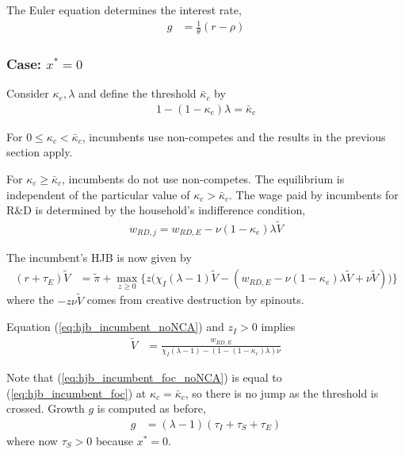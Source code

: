 \documentclass[12pt,english]{article}
\theoremstyle{remark}
\begin{document}
The Euler equation determines the interest rate, 
\begin{align}
	g &= \frac{1}{\theta} (r - \rho) \label{eq:euler}
\end{align}

\subsubsection{Case: $x^* = 0$}

Consider $\kappa_{e}, \lambda$ and define the threshold $\bar{\kappa}_c$ by 
\begin{align}
	1-(1-\kappa_{e})\lambda= \bar{\kappa}_c \label{eq_nca_threshold}
\end{align}

For $0 \le \kappa_{c} < \bar{\kappa}_c$, incumbents use non-competes and the results in the previous section apply.

For $\kappa_{c} \ge \bar{\kappa}_c$, incumbents do not use non-competes. The equilibrium is independent of the particular value of $\kappa_{c} > \bar{\kappa}_c$. The wage paid by incumbents for R\&D is determined by the household's indifference condition,
\begin{align}
	w_{RD,j} = w_{RD,E}- \nu (1-\kappa_{e}) \lambda \tilde{V} \label{eq:wage_rd}
\end{align}

The incumbent's HJB is now given by 
\begin{align}
	(r + \tau_E) \tilde{V} &= \tilde{\pi} + \max_{z \ge 0 } \Big\{ z \Big( \chi_I (\lambda - 1) \tilde{V} - (w_{RD,E} - \nu (1-\kappa_{e}) \lambda \tilde{V} + \nu \tilde{V} )\Big)  \Big\}\label{eq:hjb_incumbent_noNCA}
\end{align}
where the $-z \nu \tilde{V}$ comes from creative destruction by spinouts.

Equation (\ref{eq:hjb_incumbent_noNCA}) and $z_I > 0$ implies
\begin{align}
\tilde{V} &= \frac{w_{RD,E}}{\chi_I(\lambda - 1) - (1-(1-\kappa_{e})\lambda)\nu} \label{eq:hjb_incumbent_foc_noNCA}
\end{align}

Note that (\ref{eq:hjb_incumbent_foc_noNCA}) is equal to (\ref{eq:hjb_incumbent_foc}) at $\kappa_{c} = \bar{\kappa}_c$, so there is no jump as the threshold is crossed. Growth $g$ is computed as before,
\begin{align}
g &= (\lambda - 1)(\tau_I + \tau_S + \tau_E) \label{eq:growth_accounting_noNCA}
\end{align}
where now $\tau_S > 0$ because $x^* = 0$. 
\end{document}
